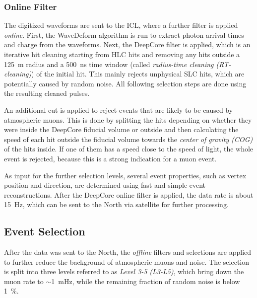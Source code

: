 \subsubsection{Online Filter} 

The digitized waveforms are sent to the ICL, where a further filter is applied \textit{online}. First, the WaveDeform algorithm is run to extract photon arrival times and charge from the waveforms. Next, the DeepCore filter is applied, which is an iterative hit cleaning starting from HLC hits and removing any hits outside a \SI{125}{\meter} radius and a \SI{500}{\nano\second} time window (called \textit{radius-time cleaning (RT-cleaning)}) of the initial hit. This mainly rejects unphysical SLC hits, which are potentially caused by random noise. All following selection steps are done using the resulting cleaned pulses.

An additional cut is applied to reject events that are likely to be caused by atmospheric muons. This is done by splitting the hits depending on whether they were inside the DeepCore fiducial volume or outside and then calculating the speed of each hit outside the fiducial volume towards the \textit{center of gravity (COG)} of the hits inside. If one of them has a speed close to the speed of light, the whole event is rejected, because this is a strong indication for a muon event.

As input for the further selection levels, several event properties, such as vertex position and direction, are determined using fast and simple event reconstructions. After the DeepCore online filter is applied, the data rate is about \SI{15}{\hertz}, which can be sent to the North via satellite for further processing.


\subsection{Event Selection} 

After the data was sent to the North, the \textit{offline} filters and selections are applied to further reduce the background of atmospheric muons and noise. The selection is split into three levels referred to as \textit{Level 3-5 (L3-L5)}, which bring down the muon rate to $\sim$\SI{1}{\milli\hertz}, while the remaining fraction of random noise is below \SI{1}{\percent}.



